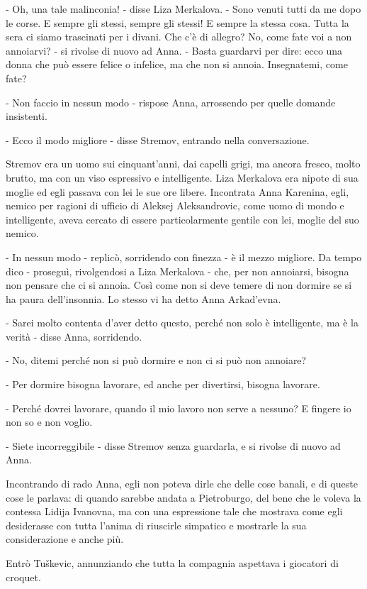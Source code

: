 - Oh, una tale malinconia! - disse Liza Merkalova. - Sono venuti tutti da me dopo le corse. E sempre gli stessi, sempre gli stessi! E sempre la stessa cosa. Tutta la sera ci siamo trascinati per i divani. Che c'è di allegro? No, come fate voi a non annoiarvi? - si rivolse di nuovo ad Anna. - Basta guardarvi per dire: ecco una donna che può essere felice o infelice, ma che non si annoia. Insegnatemi, come fate? 

- Non faccio in nessun modo - rispose Anna, arrossendo per quelle domande insistenti. 

- Ecco il modo migliore - disse Stremov, entrando nella conversazione. 

Stremov era un uomo sui cinquant'anni, dai capelli grigi, ma ancora fresco, molto brutto, ma con un viso espressivo e intelligente. Liza Merkalova era nipote di sua moglie ed egli passava con lei le sue ore libere. Incontrata Anna Karenina, egli, nemico per ragioni di ufficio di Aleksej Aleksandrovic, come uomo di mondo e intelligente, aveva cercato di essere particolarmente gentile con lei, moglie del suo nemico. 

- In nessun modo - replicò, sorridendo con finezza - è il mezzo migliore. Da tempo dico - proseguì, rivolgendosi a Liza Merkalova - che, per non annoiarsi, bisogna non pensare che ci si annoia. Così come non si deve temere di non dormire se si ha paura dell'insonnia. Lo stesso vi ha detto Anna Arkad'evna. 

- Sarei molto contenta d'aver detto questo, perché non solo è intelligente, ma è la verità - disse Anna, sorridendo. 

- No, ditemi perché non si può dormire e non ci si può non annoiare? 

- Per dormire bisogna lavorare, ed anche per divertirsi, bisogna lavorare. 

- Perché dovrei lavorare, quando il mio lavoro non serve a nessuno? E fingere io non so e non voglio. 

- Siete incorreggibile - disse Stremov senza guardarla, e si rivolse di nuovo ad Anna. 

Incontrando di rado Anna, egli non poteva dirle che delle cose banali, e di queste cose le parlava: di quando sarebbe andata a Pietroburgo, del bene che le voleva la contessa Lidija Ivanovna, ma con una espressione tale che mostrava come egli desiderasse con tutta l'anima di riuscirle simpatico e mostrarle la sua considerazione e anche più. 

Entrò Tuškevic, annunziando che tutta la compagnia aspettava i giocatori di croquet. 

